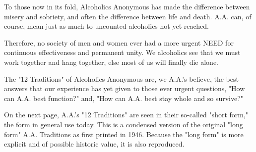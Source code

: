 

\bbChapterPreamble




\begin{biblechapter}
    To those now in its fold, 
    Alcoholics Anonymous has made the difference 
    between misery and sobriety, 
    and often the difference between life and death. 
\verse A.A. can, of course, 
    mean just as much to uncounted alcoholics not yet reached.
  
\verse Therefore, no society of men and women 
    ever had a more urgent NEED for continuous effectiveness 
    and permanent unity.
\verse We alcoholics see that we must work together and hang together, 
    else most of us will finally die alone.

\verse The "12 Traditions" of Alcoholics Anonymous are, 
    we A.A.'s believe, 
    the best answers that our experience has yet given 
    to those ever urgent questions, 
    "How can A.A. best function?" 
    and, "How can A.A. best stay whole 
    and so survive?"
  
\verse On the next page, 
    A.A.'s "12 Traditions" are seen in their so-called "short form," 
    the form in general use today.
\verse This is a condensed version of the original 
    "long form" A.A. Traditions as first printed in 1946.
\verse Because the "long form" is more explicit 
    and of possible historic value, it is also reproduced.
\end{biblechapter}


